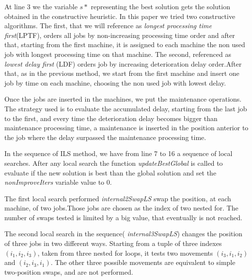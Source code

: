 \documentclass[a4paper,11pt]{article}
\begin{document}
At line 3 we the variable $s*$ representing the best solution gets the solution obtained in the constructive heuristic. In this paper we tried two constructive algorithms. The first, that we will reference as \emph{ longest processing time first}(LPTF), orders all jobs by non-increasing processing time order and after that, starting from the first machine, it is assigned to each machine the non used job with longest processing time on that machine. The second, referenced as \emph{lowest delay first} (LDF) orders job by increasing deterioration delay order.After that, as in the previous method, we start from the first machine and insert one job by time on each machine, choosing the non used job with lowest delay. 

Once the jobs are inserted in the machines, we put the maintenance operations. The strategy used is to evaluate the accumulated delay, starting from the last job to the first, and every time the deterioration delay becomes bigger than maintenance processing time, a maintenance is inserted in the position anterior to the job where the delay surpassed the maintenance processing time. 

In the sequence of ILS method, we have from line 7 to 16 a sequence of local searches. After any local search the function \emph{updateBestGlobal} is called to evaluate if the new solution is best than the global solution and set the \emph{nonImproveIters} variable value to 0.

The first local search performed \emph{internal2SwapLS} swap the position, at each machine, of two jobs.Those jobs are chosen as the index of two nested for. The number of swaps tested is limited by a big value, that eventually is not reached. 

The second local search in the sequence( \emph{internal3SwapLS}) changes the position of three jobs in two different ways. Starting from a tuple of three indexes $(i_1, i_2, i_3)$, taken from three nested for loops, it tests two movements $(i_3, i_1, i_2)$ and $(i_2, i_3,i_1)$. The other three possible movements are equivalent to simple two-position swaps, and are not performed. 



~\\


\end{document}
